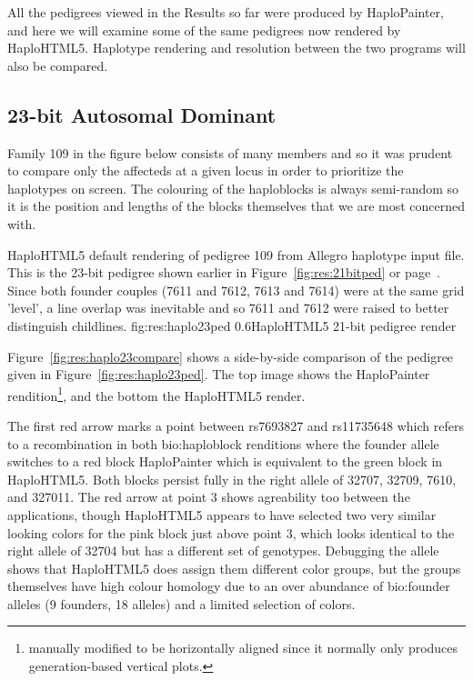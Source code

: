 All the pedigrees viewed in the Results so far were produced by HaploPainter, and here we will examine some of the same pedigrees now rendered by HaploHTML5. Haplotype rendering and resolution between the two programs will also be compared.

\subsection{23-bit Autosomal Dominant}

Family 109 in the figure below consists of many members and so it was prudent to compare only the affecteds at a given locus in order to prioritize the haplotypes on screen. The colouring of the haploblocks is always semi-random so it is the position and lengths of the blocks themselves that we are most concerned with.

	{HaploHTML5 default rendering of pedigree 109 from Allegro haplotype input file. This is the 23-bit pedigree shown earlier in Figure~\ref{fig:res:21bitped} or page~\pageref{fig:res:21bitped}. Since both founder couples (7611 and 7612, 7613 and 7614) were at the same grid 'level', a line overlap was inevitable and so 7611 and 7612 were raised to better distinguish childlines.}
	{fig:res:haplo23ped}
	{0.6}{HaploHTML5 21-bit pedigree render}


Figure~\ref{fig:res:haplo23compare} shows a side-by-side comparison of the pedigree given in Figure~\ref{fig:res:haplo23ped}. The top image shows the HaploPainter rendition\footnote{manually modified to be horizontally aligned since it normally only produces generation-based vertical plots.}, and the bottom the HaploHTML5 render.

The first red arrow marks a point between rs7693827 and rs11735648 which refers to a recombination in both \gls{bio:haploblock} renditions where the founder allele switches to a red block HaploPainter which is equivalent to the green block in HaploHTML5. Both blocks persist fully in the right allele of 32707, 32709, 7610, and 327011. The red arrow at point 3 shows agreability too between the applications, though HaploHTML5 appears to have selected two very similar looking colors for the pink block just above point 3, which looks identical to the right allele of 32704 but has a different set of genotypes. Debugging the allele shows that HaploHTML5 does assign them different color groups, but the groups themselves have high colour homology due to an over abundance of \gls{bio:founder alleles} (9 founders, 18 alleles) and a limited selection of colors.


